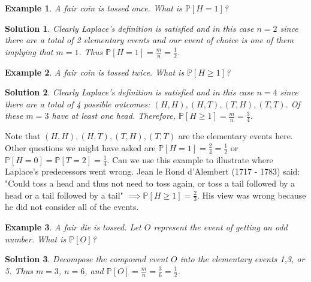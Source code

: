 \documentclass[12pt, letterpaper, onecolumn, conference, final]{IEEEtran}
\theoremstyle{definition}
\theoremstyle{plain}
\newtheorem{example}{Example}[section]
\newtheorem{solution}{Solution}[section]
\begin{document}
\begin{example}
A fair coin is tossed once. What is $\mathbb{P}[H = 1]$?
\end{example}

\newpage
\begin{solution}
Clearly Laplace's definition is satisfied and in this case $n=2$ since there are a total of 2 elementary events and our event of choice is one of them implying that $m=1$. Thus $\mathbb{P}[H = 1] = \frac{m}{n} = \frac{1}{2}$.
\end{solution}

\begin{example}
A fair coin is tossed twice. What is $\mathbb{P}[H \geq 1]$?
\end{example}
\begin{solution}
Clearly Laplace's definition is satisfied and in this case $n=4$ since there are a total of 4 possible outcomes: $(H,H), (H,T), (T,H), (T,T)$. Of these $m=3$ have at least one head. Therefore, $\mathbb{P}[H \geq 1] = \frac{m}{n} = \frac{3}{4}$.
\end{solution}

\noindent
Note that $(H,H), (H,T), (T,H), (T,T)$ are the elementary events here. Other questions we might have asked are $\mathbb{P}[H = 1] = \frac{2}{4} = \frac{1}{2}$ or $\mathbb{P}[H = 0] = \mathbb{P}[T = 2] = \frac{1}{4}$. Can we use this example to illustrate where Laplace's predecessors went wrong. Jean le Rond d'Alembert (1717 - 1783) said: "Could toss a head and thus not need to toss again, or toss a tail followed by a head or a tail followed by a tail" $\implies \mathbb{P}[H \geq 1] = \frac{2}{3}$. His view was wrong because he did not consider all of the events.

\begin{example}
A fair die is tossed. Let $O$ represent the event of getting an odd number. What is $\mathbb{P}[O]$?
\end{example}
\begin{solution}
Decompose the compound event $O$ into the elementary events 1,3, or 5. Thus $m=3$, $n=6$, and $\mathbb{P}[O] = \frac{m}{n} = \frac{3}{6} = \frac{1}{2}$.
\end{solution}

\vspace{.3cm}
\end{document}
